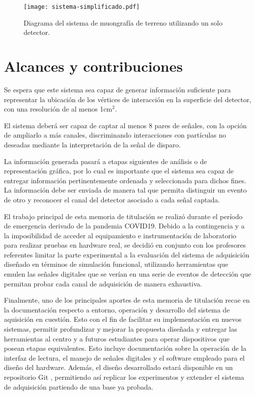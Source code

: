 	\begin{figure}[t]
		\centering
		\texttt{[image: sistema-simplificado.pdf]}
		\caption{Diagrama del sistema de muongrafía de terreno utilizando un solo detector.}
		\label{img:sistema}
	\end{figure}						

\section{Alcances y contribuciones}

	Se espera que este sistema sea capaz de generar información suficiente para representar la ubicación de los vértices de interacción en la superficie del detector, con una resolución de al menos 1cm$^2$.
	
	El sistema deberá ser capaz de captar al menos 8 pares de señales, con la opción de ampliarlo a más canales, discriminando interacciones con partículas no deseadas mediante la interpretación de la señal de disparo.
	
	La información generada pasará a etapas siguientes de análisis o de representación gráfica, por lo cual es importante que el sistema sea capaz de entregar información pertinentemente ordenada y seleccionada para dichos fines. La información debe ser enviada de manera tal que permita distinguir un evento de otro y reconocer el canal del detector asociado a cada señal captada.
	
	El trabajo principal de esta memoria de titulación se realizó durante el período de emergencia derivado de la pandemia COVID19. Debido a la contingencia y a la imposibilidad de acceder al equipamiento e instrumentación de laboratorio para realizar pruebas en hardware real, se decidió en conjunto con los profesores referentes limitar la parte experimental a la evaluación del sistema de adquisición diseñado en términos de simulación funcional, utilizando herramientas que emulen las señales digitales que se verían en una serie de eventos de detección que permitan probar cada canal de adquisición de manera exhaustiva. 

	Finalmente, uno de los principales aportes de esta memoria de titulación recae en la documentación respecto a entorno, operación y desarrollo del sistema de aquisición en cuestión. Esto con el fin de facilitar su implementación en nuevos sistemas, permitir profundizar y mejorar la propuesta diseñada y entregar las herramientas al centro y a futuros estudiantes para operar dispositivos que posean etapas equivalentes. Esto incluye documentación sobre la operación de la interfaz de lectura, el manejo de señales digitales y el software empleado para el diseño del hardware. Además, el diseño desarrollado estará disponible en un repositorio Git \cite{GonzalezMuonRepository}, permitiendo así replicar los experimentos y extender el sistema de adquisición partiendo de una base ya probada.

